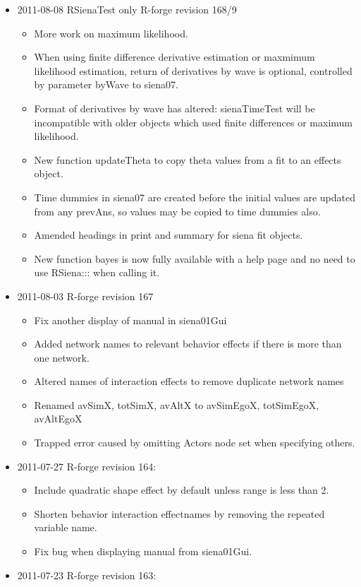 \documentclass[a4paper,fleqn,11pt]{article}
\newcommand{\+}{\, + \,}
\newcommand{\sfn}[1]{\textsf{#1}}
\begin{document}
{\begin{small}
\begin{itemize}
\item 2011-08-08 RSienaTest only R-forge revision 168/9
\begin{itemize}
\item More work on maximum likelihood.
\item When using finite difference derivative estimation or maxmimum likelihood
  estimation, return of derivatives by wave is optional, controlled by parameter
  byWave to siena07.
\item Format of derivatives by wave has altered: sienaTimeTest will be
  incompatible with older objects which used finite differences or maximum
  likelihood.
\item New function \sfn{updateTheta} to copy theta values from a fit to an
  effects object.
\item Time dummies in siena07 are created before the initial values are updated
  from any prevAns, so values may be copied to time dummies also.
\item Amended headings in print and summary for siena fit objects.
\item New function \sfn{bayes} is now fully available with a help page and no
  need to use RSiena::: when calling it.
\end{itemize}
\item 2011-08-03 R-forge revision 167
\begin{itemize}
\item Fix another display of manual in siena01Gui
\item Added network names to relevant behavior effects if there is more than one
  network.
\item Altered names of interaction effects to remove duplicate network names
\item Renamed avSimX, totSimX, avAltX to avSimEgoX, totSimEgoX, avAltEgoX
\item Trapped error caused by omitting Actors node set when specifying others.
\end{itemize}
\item 2011-07-27 R-forge revision 164:
\begin{itemize}
\item
Include quadratic shape effect by default unless range is less than 2.
\item
Shorten behavior interaction effectnames by removing the repeated variable name.
\item Fix bug when displaying manual from siena01Gui.
\end{itemize}
\item 2011-07-23 R-forge revision 163:

\end{itemize}
\end{small}}
\end{document}

